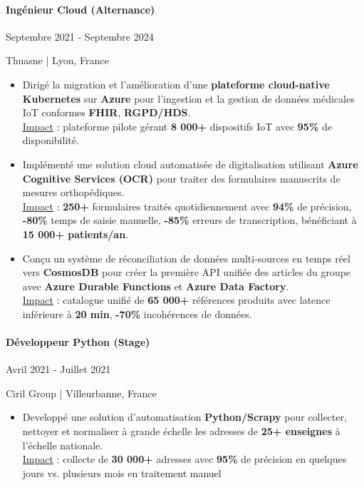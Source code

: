 \documentclass{article}
\begin{document}
\paragraph{Ingénieur Cloud (Alternance)}\hspace*{\fill}Septembre 2021 - Septembre 2024

\noindent
Thuasne | Lyon, France

\raggedright  
\begin{itemize}
    \item{Dirigé la migration et l'amélioration d'une \textbf{plateforme cloud-native Kubernetes} sur \textbf{Azure} pour l'ingestion et la gestion de données médicales IoT conformes \textbf{FHIR}, \textbf{RGPD/HDS}. \\ \underline{Impact} : plateforme pilote gérant \textbf{8 000+} dispositifs IoT avec \textbf{95\%} de disponibilité.}
    \item{Implémenté une solution cloud automatisée de digitalisation utilisant \textbf{Azure Cognitive Services (OCR)} pour traiter des formulaires manuscrits de mesures orthopédiques.\\ \underline{Impact} : \textbf{250+} formulaires traités quotidiennement avec \textbf{94\%} de précision, \textbf{-80\%} temps de saisie manuelle, \textbf{-85\%} erreurs de transcription, bénéficiant à \textbf{15 000+ patients/an}.}
    \item{Conçu un système de réconciliation de données multi-sources en temps réel vers \textbf{CosmosDB} pour créer la première API unifiée des articles du groupe avec \textbf{Azure Durable Functions} et \textbf{Azure Data Factory}.\\ \underline{Impact} : catalogue unifié de \textbf{65 000+} références produits avec latence inférieure à \textbf{20 min}, \textbf{-70\%} incohérences de données.}
\end{itemize}
\paragraph{Développeur Python (Stage)}\hspace*{\fill}Avril 2021 - Juillet 2021

\noindent
Ciril Group | Villeurbanne, France

\raggedright  
\begin{itemize}
    \item{Developpé une solution d'automatisation \textbf{Python/Scrapy} pour collecter, nettoyer et normaliser à grande échelle les adresses de \textbf{25+ enseignes} à l'échelle nationale.\\ \underline{Impact} : collecte de \textbf{30 000+} adresses avec \textbf{95\%} de précision en quelques jours vs. plusieurs mois en traitement manuel}
\end{itemize}
\end{document}
